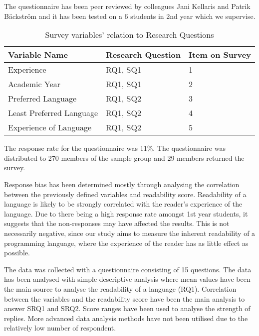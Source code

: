 \documentclass[times, 10pt,twocolumn]{Article}
\begin{document}
The questionnaire has been peer reviewed by colleagues Jani Kellaris and Patrik Bäckström and it has been tested on a 6 students in 2nd year which we supervise. 

\begin{table}[ht]
  \centering
  \begin{tabularx}
  {\linewidth}{| l | X | X |}
    \hline
    \textbf{Variable Name} & \textbf{Research Question} & \textbf{Item on Survey} \\ \hline
    Experience & RQ1, SQ1 & 1 \\ \hline
    Academic Year & RQ1, SQ1 & 2 \\ \hline
    Preferred Language & RQ1, SQ2 & 3 \\ \hline
    Least Preferred Language & RQ1, SQ2& 4 \\  \hline
    Experience of Language & RQ1, SQ2 & 5 \\ 
    \hline
  \end{tabularx}
  \caption{Survey variables' relation to Research Questions}
\end{table}

The response rate for the questionnaire was 11\%. The questionnaire was distributed to 270 members of the sample group and 29 members returned the survey.

Response bias has been determined mostly through analysing the correlation between the previously defined variables and readability score. Readability of a language is likely to be strongly correlated with the reader's experience of the language. Due to there being a high response rate amongst 1st year students, it suggests that the non-responses may have affected the results. This is not necessarily negative, since our study aims to measure the inherent readability of a programming language, where the experience of the reader has as little effect as possible.

The data was collected with a questionnaire consisting of 15 questions. The data has been analysed with simple descriptive analysis where mean values have been the main source to analyse the readability of a language (RQ1). Correlation between the variables and the readability score have been the main analysis to answer SRQ1 and SRQ2. Score ranges have been used to analyse the strength of replies. More advanced data analysis methods have not been utilised due to the relatively low number of respondent. 
\end{document}
